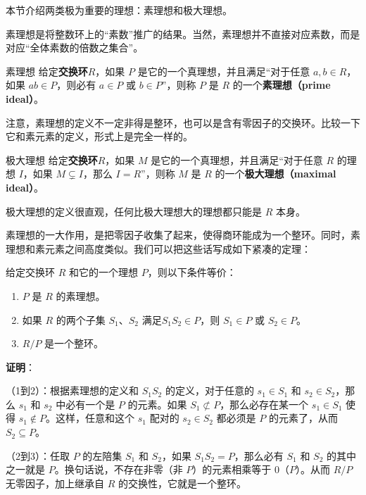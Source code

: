 

本节介绍两类极为重要的理想：素理想和极大理想。


素理想是将整数环上的“素数”推广的结果。当然，素理想并不直接对应素数，而是对应“全体素数的倍数之集合”。


\begin{definition}{素理想}
给定\textbf{交换环}$R$，如果 $P$ 是它的一个真理想，并且满足“对于任意 $a, b\in R$，如果 $ab\in P$，则必有 $a\in P$ 或 $b\in P$”，则称 $P$ 是 $R$ 的一个\textbf{素理想（prime ideal）}。
\end{definition}

注意，素理想的定义不一定非得是整环，也可以是含有零因子的交换环。比较一下它和素元素的定义，形式上是完全一样的。

\begin{definition}{极大理想}
给定\textbf{交换环}$R$，如果 $M$ 是它的一个真理想，并且满足“对于任意 $R$ 的理想 $I$，如果 $M\subsetneq I$，那么 $I=R$”，则称 $M$ 是 $R$ 的一个\textbf{极大理想（maximal ideal）}。
\end{definition}

极大理想的定义很直观，任何比极大理想大的理想都只能是 $R$ 本身。

素理想的一大作用，是把零因子收集了起来，使得商环能成为一个整环。同时，素理想和素元素之间高度类似。我们可以把这些话写成如下紧凑的定理：

\begin{theorem}{}\label{Ideals_the1}
给定交换环 $R$ 和它的一个理想 $P$，则以下条件等价：
\begin{enumerate}
\item $P$ 是 $R$ 的素理想。
\item 如果 $R$ 的两个子集 $S_1$、$S_2$ 满足$S_1S_2\in P$，则 $S_1\in P$ 或 $S_2\in P$。
\item $R/P$ 是一个整环。
\end{enumerate}
\end{theorem}

\textbf{证明}：

（1到2）：根据素理想的定义和 $S_1S_2$ 的定义，对于任意的 $s_1\in S_1$ 和 $s_2\in S_2$，那么 $s_1$ 和 $s_2$ 中必有一个是 $P$ 的元素。如果 $S_1\not\subset P$，那么必存在某一个 $s_1\in S_1$ 使得 $s_1\not\in P$。这样，任意和这个 $s_1$ 配对的 $s_2\in S_2$ 都必须是 $P$ 的元素了，从而 $S_2\subseteq P$。

（2到3）：任取 $P$ 的左陪集 $S_1$ 和 $S_2$，如果 $S_1S_2=P$，那么必有 $S_1$ 和 $S_2$ 的其中之一就是 $P$。换句话说，不存在非零（非 $P$）的元素相乘等于 $0$（$P$）。从而 $R/P$ 无零因子，加上继承自 $R$ 的交换性，它就是一个整环。

